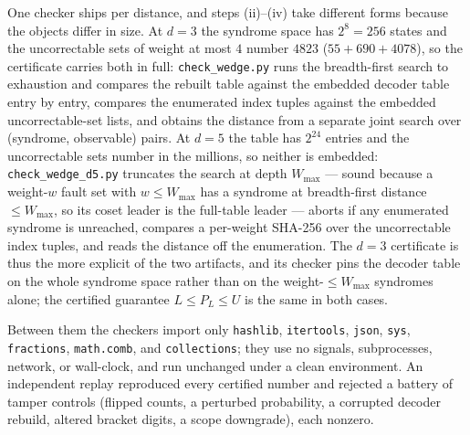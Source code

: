 \documentclass[11pt]{amsart}
\newcommand{\PL}{P_{L}}
\newcommand{\WMAX}{W_{\max}}
\theoremstyle{plain}
\theoremstyle{definition}
\theoremstyle{remark}
\begin{document}
One checker ships per distance, and steps (ii)--(iv) take different forms
because the objects differ in size. At $d=3$ the syndrome space has
$2^{8}=256$ states and the uncorrectable sets of weight at most $4$ number
$4823$ ($55+690+4078$), so the
certificate carries both in full: \texttt{check\_wedge.py} runs the
breadth-first search to exhaustion and compares the rebuilt table against the
embedded decoder table entry by entry, compares the enumerated index tuples
against the embedded uncorrectable-set lists, and obtains the distance from a
separate joint search over (syndrome, observable) pairs. At $d=5$ the table has
$2^{24}$ entries and the uncorrectable sets number in the millions, so neither
is embedded: \texttt{check\_wedge\_d5.py} truncates the search at depth
$\WMAX$ --- sound because a weight-$w$ fault set with $w\le\WMAX$ has a
syndrome at breadth-first distance $\le\WMAX$, so its coset leader is the
full-table leader --- aborts if any enumerated syndrome is unreached, compares
a per-weight SHA-256 over the uncorrectable index tuples, and reads the
distance off the enumeration. The $d=3$ certificate is thus the more explicit
of the two artifacts, and its checker pins the decoder table on the whole
syndrome space rather than on the weight-$\le\WMAX$ syndromes alone; the
certified guarantee $L\le\PL\le U$ is the same in both cases.

Between them the checkers import only \texttt{hashlib}, \texttt{itertools},
\texttt{json}, \texttt{sys}, \texttt{fractions}, \texttt{math.comb}, and
\texttt{collections}; they use no signals, subprocesses, network, or
wall-clock, and run unchanged under a clean environment. An independent
replay reproduced every certified number and rejected a battery of tamper
controls (flipped counts, a perturbed probability, a corrupted decoder
rebuild, altered bracket digits, a scope downgrade), each nonzero.
\end{document}
